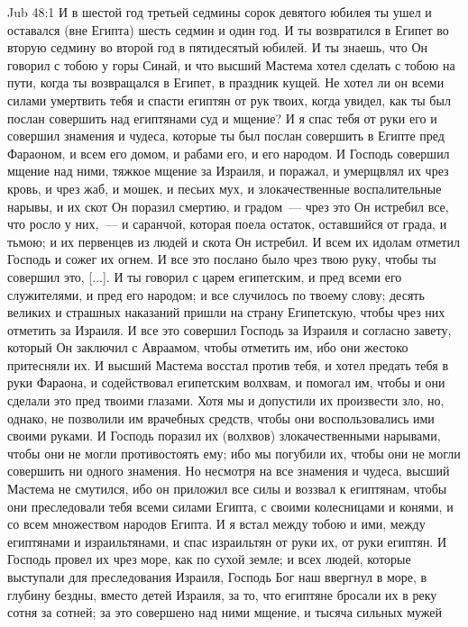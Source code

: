 \vs Jub 48:1
И в шестой год третьей седмины сорок девятого
юбилея ты ушел и оставался (вне Египта) шесть
седмин и один год. И ты возвратился в Египет во
вторую седмину во второй год в пятидесятый
юбилей. И ты знаешь, что Он говорил с тобою у горы
Синай, и что высший Мастема хотел сделать с тобою
на пути, когда ты возвращался в Египет, в праздник
кущей. Не хотел ли он всеми силами умертвить тебя
и спасти египтян от рук твоих, когда увидел, как
ты был послан совершить над египтянами суд и
мщение? И я спас тебя от руки его и совершил
знамения и чудеса, которые ты был послан
совершить в Египте пред Фараоном, и всем его
домом, и рабами его, и его народом. И Господь
совершил мщение над ними, тяжкое мщение за
Израиля, и поражал, и умерщвлял их чрез кровь, и
чрез жаб, и мошек, и песьих мух, и злокачественные
воспалительные нарывы, и их скот Он поразил смертию,
и градом~--- чрез это Он истребил все, что росло у
них,~--- и саранчой, которая поела остаток,
оставшийся от града, и тьмою; и их первенцев из
людей и скота Он истребил. И всем их идолам
отметил Господь и сожег их огнем. И все это
послано было чрез твою руку, чтобы ты совершил
это, [...]. И ты говорил с царем египетским, и пред
всеми его служителями, и пред его народом; и все
случилось по твоему слову; десять великих и
страшных наказаний пришли на страну Египетскую,
чтобы чрез них отметить за Израиля. И все это
совершил Господь за Израиля и согласно завету,
который Он заключил с Авраамом, чтобы отметить
им, ибо они жестоко притесняли их. И высший
Мастема восстал против тебя, и хотел предать тебя
в руки Фараона, и содействовал египетским
волхвам, и помогал им, чтобы и они сделали это
пред твоими глазами. Хотя мы и допустили их
произвести зло, но, однако, не позволили им
врачебных средств, чтобы они воспользовались ими
своими руками. И Господь поразил их (волхвов)
злокачественными нарывами, чтобы они не могли
противостоять ему; ибо мы погубили их, чтобы они
не могли совершить ни одного знамения. Но
несмотря на все знамения и чудеса, высший Мастема
не смутился, ибо он приложил все силы и воззвал к
египтянам, чтобы они преследовали тебя всеми
силами Египта, с своими колесницами и конями, и со
всем множеством народов Египта. И я встал между
тобою и ими, между египтянами и израильтянами, и
спас израильтян от руки их, от руки египтян. И
Господь провел их чрез море, как по сухой земле; и
всех людей, которые выступали для преследования
Израиля, Господь Бог наш ввергнул в море, в
глубину бездны, вместо детей Израиля, за то, что
египтяне бросали их в реку сотня за сотней; за это
совершено над ними мщение, и тысяча сильных мужей
